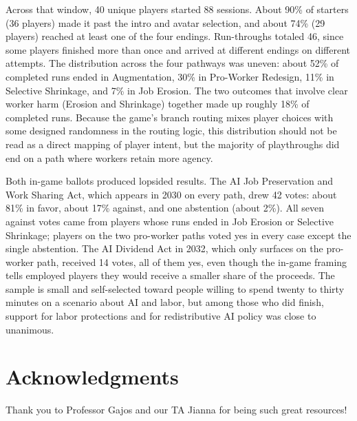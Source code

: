 \documentclass[sigconf,authordraft]{acmart}
\begin{document}
Across that window, 40 unique players started 88 sessions. About 90\% of starters (36 players) made it past the intro and avatar selection, and about 74\% (29 players) reached at least one of the four endings. Run-throughs totaled 46, since some players finished more than once and arrived at different endings on different attempts. The distribution across the four pathways was uneven: about 52\% of completed runs ended in Augmentation, 30\% in Pro-Worker Redesign, 11\% in Selective Shrinkage, and 7\% in Job Erosion. The two outcomes that involve clear worker harm (Erosion and Shrinkage) together made up roughly 18\% of completed runs. Because the game's branch routing mixes player choices with some designed randomness in the routing logic, this distribution should not be read as a direct mapping of player intent, but the majority of playthroughs did end on a path where workers retain more agency.

Both in-game ballots produced lopsided results. The AI Job Preservation and Work Sharing Act, which appears in 2030 on every path, drew 42 votes: about 81\% in favor, about 17\% against, and one abstention (about 2\%). All seven against votes came from players whose runs ended in Job Erosion or Selective Shrinkage; players on the two pro-worker paths voted yes in every case except the single abstention. The AI Dividend Act in 2032, which only surfaces on the pro-worker path, received 14 votes, all of them yes, even though the in-game framing tells employed players they would receive a smaller share of the proceeds. The sample is small and self-selected toward people willing to spend twenty to thirty minutes on a scenario about AI and labor, but among those who did finish, support for labor protections and for redistributive AI policy was close to unanimous.



\section{Acknowledgments}

Thank you to Professor Gajos and our TA Jianna for being such great resources!









\appendix
\end{document}

